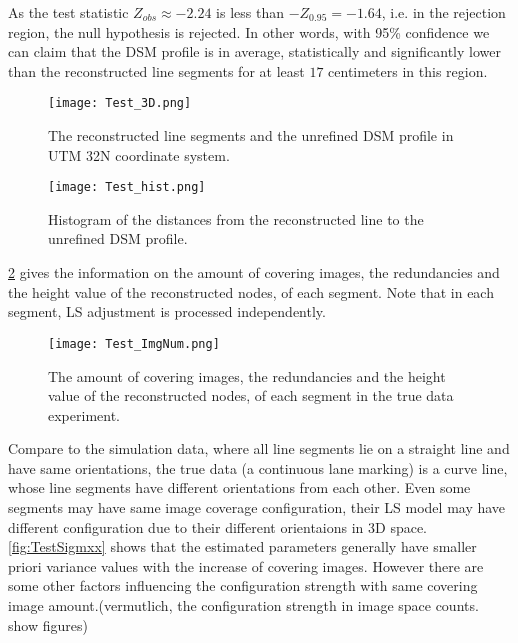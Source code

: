 As the test statistic $Z_{obs}\approx-2.24$ is less than $-Z_{0.95}=-1.64$, i.e. in the rejection region, the null hypothesis is rejected. In other words, {with 95\% confidence we can claim that the DSM profile is in average, statistically and significantly lower than the reconstructed line segments for at least $17$ centimeters in this region}. %

\begin{figure}
  \centering
  \texttt{[image: Test\_3D.png]}
  \caption{\small The reconstructed line segments and the unrefined DSM profile in UTM 32N coordinate system.}
  \label{fig:Test3D}
  \vspace{1cm}
  \texttt{[image: Test\_hist.png]}
  \caption{\small Histogram of the distances from the reconstructed line to the unrefined DSM profile.}
  \label{fig:TestHist}
\end{figure}

\clearpage

\cref{fig:TestImgNum} gives the information on the amount of covering images, the redundancies and the height value of the reconstructed nodes, of each segment. Note that in each segment, LS adjustment is processed independently.

\begin{figure}
  \centering
  \texttt{[image: Test\_ImgNum.png]}
  \caption{\small The amount of covering images, the redundancies and the height value of the reconstructed nodes, of each segment in the true data experiment.}
  \label{fig:TestImgNum}
\end{figure}




Compare to the simulation data, where all line segments lie on a straight line and have same orientations, the true data (a continuous lane marking) is a curve line, whose line segments have different orientations from each other. Even some segments may have same image coverage configuration, their LS model may have different configuration due to their different orientaions in 3D space. \cref{fig:TestSigmxx} shows that the estimated parameters generally have smaller priori variance values with the increase of covering images. However there are some other factors influencing the configuration strength with same covering image amount.(vermutlich, the configuration strength in image space counts. show figures)


